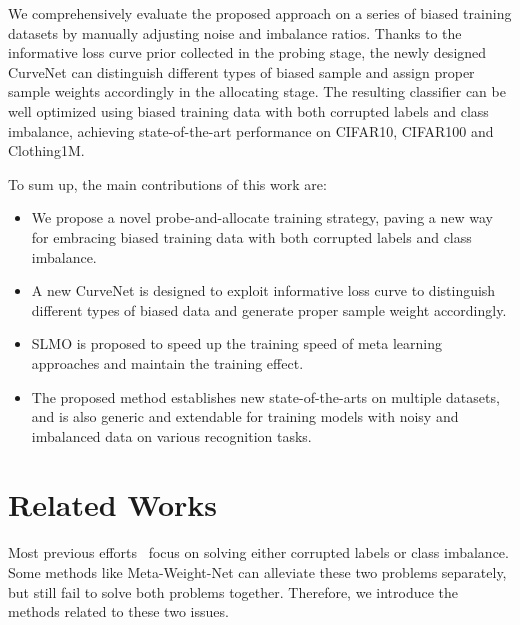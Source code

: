\documentclass[letterpaper]{article} %
\begin{document}
We comprehensively evaluate the proposed approach on a series of biased training datasets by manually adjusting noise and imbalance ratios. Thanks to the informative loss curve prior collected in the probing stage, the newly designed CurveNet can distinguish different types of biased sample and assign proper sample weights accordingly in the allocating stage. The resulting classifier can be well optimized using biased training data with both corrupted labels and class imbalance, achieving state-of-the-art performance on CIFAR10, CIFAR100 and Clothing1M.

To sum up, the main contributions of this work are:
\begin{itemize}
\item We propose a novel probe-and-allocate training strategy, paving a new way for embracing biased training data with both corrupted labels and class imbalance.
\item A new CurveNet is designed to exploit informative loss curve to distinguish different types of biased data and generate proper sample weight accordingly.
\item SLMO is proposed to speed up the training speed of meta learning approaches and maintain the training effect.
\item The proposed method establishes new state-of-the-arts on multiple datasets, and is also generic and extendable for training models with noisy and imbalanced data on various recognition tasks.
\end{itemize}

\section{Related Works}

Most previous efforts~\cite{kumar2010self,pi2016self,hendrycks2018using,ma2018dimensionality} focus on solving either corrupted labels or class imbalance.
Some methods like Meta-Weight-Net \cite{shu2019meta} can alleviate these two problems separately, but still fail to solve both problems together.
Therefore, we introduce the methods related to these two issues.
\end{document}
